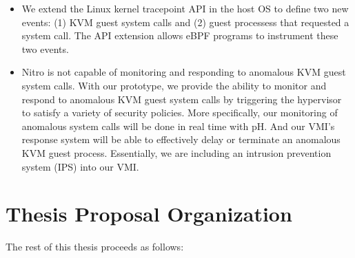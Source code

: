 \documentclass{report}
\begin{document}
\begin{spacing}{1.5}
{\begin{itemize}
  \item We extend the Linux kernel tracepoint API in the host OS to define two new events: (1) KVM guest system calls and (2) guest processess that requested a system call. The API extension allows eBPF programs to instrument these two events.
  
  \item Nitro is not capable of monitoring and responding to anomalous KVM guest system calls. With our prototype, we provide the ability to monitor and respond to anomalous KVM guest system calls by triggering the hypervisor to satisfy a variety of security policies. More specifically, our monitoring of anomalous system calls will be done in real time with pH. And our VMI's response system will be able to effectively delay or terminate an anomalous KVM guest process. Essentially, we are including an intrusion prevention system (IPS) into our VMI.
\newline  
\end{itemize}
}









\section{Thesis Proposal Organization}
{\large
The rest of this thesis proceeds as follows:

}
\end{spacing}
\end{document}
